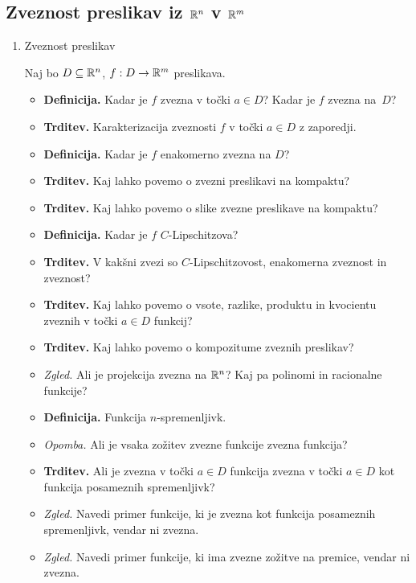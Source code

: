 \subsection{Zveznost preslikav iz $\mathbb{R}^n$ v $\mathbb{R}^m$}
\begin{enumerate}
    \item Zveznost preslikav
    
    Naj bo $D \subseteq \mathbb{R}^n$, $f: D \to \mathbb{R}^m$ preslikava. 
    \begin{itemize}
        \item \colorbox{purple!30}{\textbf{Definicija.}} Kadar je $f$ zvezna v točki $a \in D$? Kadar je $f$ zvezna na~$D$?
        \item \colorbox{blue!30}{\textbf{Trditev.}} Karakterizacija zveznosti $f$ v točki $a \in D$ z zaporedji.
        \item \colorbox{purple!30}{\textbf{Definicija.}} Kadar je $f$ enakomerno zvezna na $D$?
        \item \colorbox{blue!30}{\textbf{Trditev.}} Kaj lahko povemo o zvezni preslikavi na kompaktu? \todo{*}
        \item \colorbox{blue!30}{\textbf{Trditev.}} Kaj lahko povemo o slike zvezne preslikave na kompaktu?
        \item \colorbox{purple!30}{\textbf{Definicija.}} Kadar je $f$ $C$-Lipschitzova?
        \item \colorbox{blue!30}{\textbf{Trditev.}} V kakšni zvezi so $C$-Lipschitzovost, enakomerna zveznost in zveznost?
        \item \colorbox{blue!30}{\textbf{Trditev.}} Kaj lahko povemo o vsote, razlike, produktu in kvocientu zveznih v točki $a \in D$ funkcij?
        \item \colorbox{blue!30}{\textbf{Trditev.}} Kaj lahko povemo o kompozitume zveznih preslikav?
        \item \colorbox{yellow!30}{\emph{Zgled.}} Ali je projekcija zvezna na $\mathbb{R}^n$? Kaj pa polinomi in racionalne funkcije?
        \item \colorbox{purple!30}{\textbf{Definicija.}} Funkcija $n$-spremenljivk.
        \item \colorbox{yellow!30}{\emph{Opomba.}} Ali je vsaka zožitev zvezne funkcije zvezna funkcija?
        \item \colorbox{blue!30}{\textbf{Trditev.}} Ali je zvezna v točki $a \in D$ funkcija zvezna v točki $a \in D$ kot funkcija posameznih spremenljivk?
        \item \colorbox{yellow!30}{\emph{Zgled.}} Navedi primer funkcije, ki je zvezna kot funkcija posameznih spremenljivk, vendar ni zvezna.
        \item \colorbox{yellow!30}{\emph{Zgled.}} Navedi primer funkcije, ki ima zvezne zožitve na premice, vendar ni zvezna.
    \end{itemize}


\end{enumerate}
